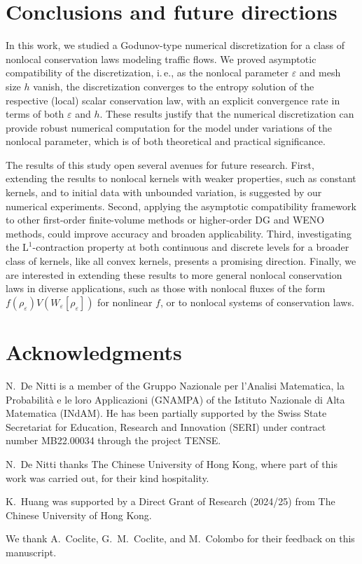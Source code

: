 \documentclass[10pt]{amsart}
\theoremstyle{plain}
\theoremstyle{definition}
\numberwithin{equation}{section}
\newcommand{\eps}{{\varepsilon}}
\begin{document}
\section{Conclusions and future directions}
\label{sec:conclusion}

In this work, we studied a Godunov-type numerical discretization for a class of nonlocal conservation laws modeling traffic flows. We proved asymptotic compatibility of the discretization, i.\,e., as the nonlocal parameter $\eps$ and mesh size $h$ vanish, the discretization converges to the entropy solution of the respective (local) scalar conservation law, with an explicit convergence rate in terms of both $\eps$ and $h$.
These results justify that the numerical discretization can provide robust numerical computation for the model under variations of the nonlocal parameter, which is of both theoretical and practical significance.

The results of this study open several avenues for future research. First, extending the results to nonlocal kernels with weaker properties, such as constant kernels, and to initial data with unbounded variation, is suggested by our numerical experiments. Second, applying the asymptotic compatibility framework to other first-order finite-volume methods or higher-order DG and WENO methods, could improve accuracy and broaden applicability. Third, investigating the $\mathrm L^1$-contraction property at both continuous and discrete levels for a broader class of kernels, like all convex kernels, presents a promising direction. Finally, we are interested in extending these results to more general nonlocal conservation laws in diverse applications, such as those with nonlocal fluxes of the form $f(\rho_\eps)V(W_\eps[\rho_\eps])$ for nonlinear $f$, or to nonlocal systems of conservation laws.

\vspace{0.5cm}



\section*{Acknowledgments}

N.~De Nitti is a member of the Gruppo Nazionale per l’Analisi Matematica, la Probabilità e le loro Applicazioni (GNAMPA) of the Istituto Nazionale di Alta Matematica (INdAM). He has been partially supported by the Swiss State Secretariat for Education, Research and Innovation (SERI) under contract number MB22.00034 through the project TENSE.

N.~De Nitti thanks The Chinese University of Hong Kong, where part of this work was carried out, for their kind hospitality. 

K.~Huang was supported by a Direct Grant of Research (2024/25) from The Chinese University of Hong Kong.

We thank A.~Coclite, G.~M.~Coclite, and M.~Colombo for their feedback on this manuscript.

\vspace{0.5cm}

\printbibliography

\vfill 
\end{document}

